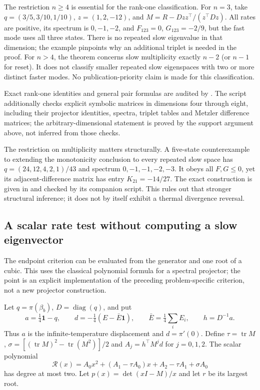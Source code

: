 \documentclass[11pt]{article}
\begin{document}
The restriction $n\geq4$ is essential for the rank-one classification.
For $n=3$, take $q=(3/5,3/10,1/10)$, $z=(1,2,-12)$, and
$M=R-Dzz^\top/(z^\top Dz)$. All rates are positive, its spectrum is
$0,-1,-2$, and $F_{123}=0$, $G_{123}=-2/9$, but the fast mode uses
all three states. There is no repeated slow eigenvalue in that dimension;
the example pinpoints why an additional triplet is needed in the proof.
For $n>4$, the theorem concerns slow multiplicity exactly $n-2$ (or
$n-1$ for reset). It does not classify smaller repeated slow eigenspaces
with two or more distinct faster modes. No publication-priority claim
is made for this classification.

Exact rank-one identities and general pair formulas are audited by
. The script additionally
checks explicit symbolic matrices in dimensions four through eight,
including their projector identities, spectra, triplet tables and
Metzler difference matrices; the arbitrary-dimensional statement is
proved by the support argument above, not inferred from those checks.

The restriction on multiplicity matters structurally. A five-state
counterexample to extending the monotonicity conclusion to every repeated
slow space has $q=(24,12,4,2,1)/43$ and spectrum
$0,-1,-1,-2,-3$. It obeys all $F,G\leq0$, yet its adjacent-difference
matrix has entry $K_{21}=-14/27$. The exact construction is given in
 and checked by its
companion script. This rules out that stronger structural inference;
it does not by itself exhibit a thermal divergence reversal.

\subsection{A scalar rate test without computing a slow eigenvector}
\label{sec:rateendpoint}
The endpoint criterion can be evaluated from the generator and one root
of a cubic. This uses the classical polynomial formula for a spectral
projector; the point is an explicit implementation of the preceding
problem-specific criterion, not a new projector construction.

Let $q=\pi(\beta_b)$, $D=\operatorname{diag}(q)$, and put
\[
a=\tfrac14\mathbf1-q,\qquad
d=-\tfrac14(E-\bar E\mathbf1),\qquad
\bar E=\tfrac14\sum_i E_i,\qquad h=D^{-1}a.
\]
Thus $a$ is the infinite-temperature displacement and $d=\pi'(0)$.
Define $\tau=\operatorname{tr}M$,
$\sigma=[(\operatorname{tr}M)^2-\operatorname{tr}(M^2)]/2$ and
$A_j=h^\top M^j d$ for $j=0,1,2$. The scalar polynomial
\[
\mathcal R(x)=A_0x^2+(A_1-\tau A_0)x
                  +A_2-\tau A_1+\sigma A_0
\]
has degree at most two. Let
$p(x)=\det(xI-M)/x$ and let $r$ be its largest root.
\end{document}
